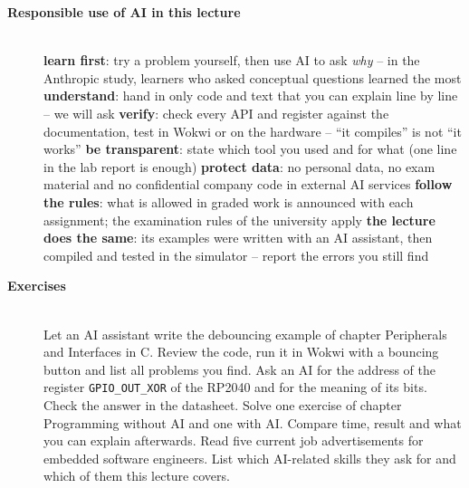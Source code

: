 \begin{description}
\item[{\rot\bf Responsible use of AI in this lecture}]~\\[-\lblskip]
\bi
	\ite \textbf{learn first}: try a problem yourself, then use AI to ask \emph{why} -- in the Anthropic study, learners who asked conceptual questions learned the most \cite{anthropic2026skills}
	\ite \textbf{understand}: hand in only code and text that you can explain line by line -- we will ask
	\ite \textbf{verify}: check every API and register against the documentation, test in Wokwi or on the hardware -- ``it compiles'' is not ``it works''
	\ite \textbf{be transparent}: state which tool you used and for what (one line in the lab report is enough)
	\ite \textbf{protect data}: no personal data, no exam material and no confidential company code in external AI services
	\ite \textbf{follow the rules}: what is allowed in graded work is announced with each assignment; the examination rules of the university apply
	\ite \textbf{the lecture does the same}: its examples were written with an AI assistant, then compiled and tested in the simulator -- report the errors you still find
\ei
\os{\newpage}

\item[{\rot\bf Exercises}]~\\[-\lblskip]
\bi
	\ite Let an AI assistant write the debouncing example of chapter Peripherals and Interfaces in C. Review the code, run it in Wokwi with a bouncing button and list all problems you find.
	\ite Ask an AI for the address of the register \texttt{GPIO\_OUT\_XOR} of the RP2040 and for the meaning of its bits. Check the answer in the datasheet.
	\ite Solve one exercise of chapter Programming without AI and one with AI. Compare time, result and what you can explain afterwards.
	\ite Read five current job advertisements for embedded software engineers. List which AI-related skills they ask for and which of them this lecture covers.
\ei
\os{\newpage}
\end{description}

